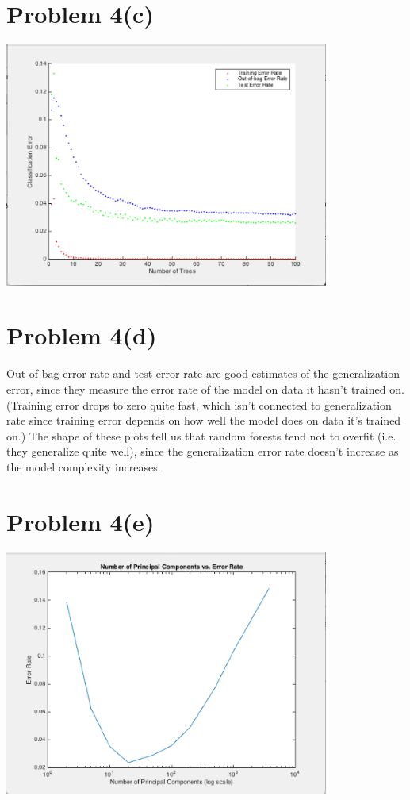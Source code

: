\documentclass{article}
\begin{document}
\section*{Problem 4(c)}

\begin{center}
\includegraphics[width=0.8\textwidth]{4c.png}
\end{center}

\section*{Problem 4(d)}

Out-of-bag error rate and test error rate are good estimates of the generalization error, since they measure the error rate of the model on data it hasn't trained on. (Training error drops to zero quite fast, which isn't connected to generalization rate since training error depends on how well the model does on data it's trained on.) The shape of these plots tell us that random forests tend not to overfit (i.e. they generalize quite well), since the generalization error rate doesn't increase as the model complexity increases.

\section*{Problem 4(e)}

\begin{center}
\includegraphics[width=0.8\textwidth]{4e.png}
\end{center}
\end{document}
